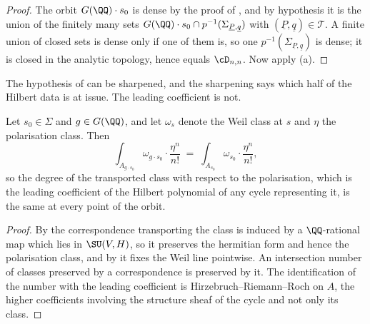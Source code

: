 \begin{proof}
The orbit $G(\QQ)\cdot s_{0}$ is dense by the proof of ,
and by hypothesis it is the union of the finitely many sets
$G(\QQ)\cdot s_{0}\cap p^{-1}(\Sigma_{\underline{P},\underline{q}})$ with
$(\underline{P},\underline{q})\in\mathcal{T}$. A finite
union of closed sets is dense only if one of them is, so one
$p^{-1}(\Sigma_{\underline{P},\underline{q}})$ is dense; it is closed in the
analytic topology, hence equals $\cD_{n,n}$. Now apply
(a).
\end{proof}

The hypothesis of  can be sharpened, and the sharpening
says which half of the Hilbert data is at issue. The leading coefficient is
not.

\begin{proposition}
\label{prop:leadingconstant}
Let $s_{0}\in\Sigma$ and $g\in G(\QQ)$, and let $\omega_{s}$ denote the Weil
class at $s$ and $\eta$ the polarisation class. Then
\[
  \int_{A_{g\cdot s_{0}}}\omega_{g\cdot s_{0}}\cdot\frac{\eta^{n}}{n!}
  \;=\;\int_{A_{s_{0}}}\omega_{s_{0}}\cdot\frac{\eta^{n}}{n!},
\]
so the degree of the transported class with respect to the polarisation, which
is the leading coefficient of the Hilbert polynomial of any cycle
representing it, is the same at every point of the orbit.
\end{proposition}

\begin{proof}
By  the correspondence transporting the class is induced
by a $\QQ$-rational map which lies in $\SU(V,H)$, so it preserves the
hermitian form and hence the polarisation class, and by
 it fixes the Weil line pointwise. An intersection
number of classes preserved by a correspondence is preserved by it. The
identification of the number with the leading coefficient is
Hirzebruch--Riemann--Roch on $A$, the higher coefficients involving the
structure sheaf of the cycle and not only its class.
\end{proof}

